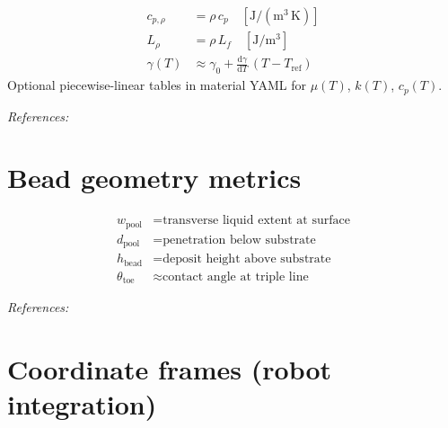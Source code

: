 \documentclass[11pt,a4paper]{article}
\newcommand{\fref}[1]{\par\smallskip\noindent\textit{References:} #1\par}
\begin{document}
\begin{align}
  c_{p,\rho} &= \rho\,c_p \quad [\mathrm{J/(m^3\,K)}] \\
  L_\rho &= \rho\,L_f \quad [\mathrm{J/m^3}] \\
  \gamma(T) &\approx \gamma_0 + \frac{\mathrm{d}\gamma}{\mathrm{d}T}\,(T - T_{\mathrm{ref}})
\end{align}
Optional piecewise-linear tables in material YAML for $\mu(T)$, $k(T)$, $c_p(T)$.
\fref{\cite{Incropera2007,Kou2003,waam_twin2025}}

\section{Bead geometry metrics}

\begin{center}
\end{center}

\begin{align}
  w_{\mathrm{pool}} &= \text{transverse liquid extent at surface} \\
  d_{\mathrm{pool}} &= \text{penetration below substrate} \\
  h_{\mathrm{bead}} &= \text{deposit height above substrate} \\
  \theta_{\mathrm{toe}} &\approx \text{contact angle at triple line}
\end{align}
\fref{\cite{waam_twin2025,Kou2003,BEAD2025}}

\section{Coordinate frames (robot integration)}
\end{document}
